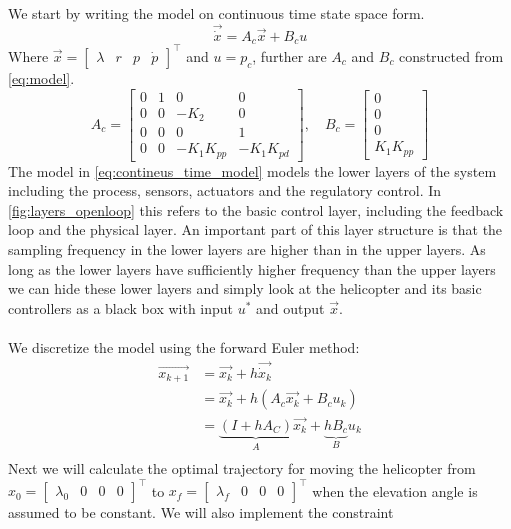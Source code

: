 We start by writing the model on continuous time state space form.
\begin{equation}\label{eq:contineus_time_model}
    \vec{\dot{x}} = A_c\vec{x} + B_c u 
\end{equation}
Where $\vec{x}=\begin{bmatrix} \lambda&r&p&\dot{p} \end{bmatrix}^\top$ and $u=p_c$, further are $A_c$ and $B_c$ constructed from \cref{eq:model}. 
\begin{equation*}
A_c =
    \begin{bmatrix}
        0 &  1 &  0 & 0 \\
        0 &  0 &  -K_2 & 0  \\
        0 &  0 &  0 & 1 \\
        0 &  0 & -K_1K_{pp} & -K_1K_{pd}                                 
    \end{bmatrix}
    , \quad B_c = 
    \begin{bmatrix} 0 \\ 0 \\ 0 \\ K_1K_{pp} \end{bmatrix}
\end{equation*}
The model in \cref{eq:contineus_time_model} models the lower layers of the system including the process, sensors, actuators and the regulatory control. In \cref{fig:layers_openloop} this refers to the basic control layer, including the feedback loop and the physical layer. An important part of this layer structure is that the sampling frequency in the lower layers are higher than in the upper layers. As long as the lower layers have sufficiently higher frequency than the upper layers we can hide these lower layers and simply look at the helicopter and its basic controllers as a black box with input $u^*$ and output $\vec{x}$.\\
\\
We discretize the model using the forward Euler method:
\begin{align*}
    \vec{x_{k+1}} &= \vec{x_k} + h\vec{\dot{x}_k} \\
                  &= \vec{x_k} + h(A_c\vec{x_k} + B_c u_k) \\
                  &= \underbrace{(I + hA_C)}_{A}\vec{x_k} + \underbrace{hB_c}_{B} u_k \\
\end{align*}
Next we will calculate the optimal trajectory for moving the helicopter from $x_0 = \begin{bmatrix}\lambda_0 &0&0&0 \end{bmatrix}^\top$ to $x_f = \begin{bmatrix}\lambda_f &0&0&0 \end{bmatrix}^\top$ when the elevation angle is assumed to be constant. We will also implement the constraint 
